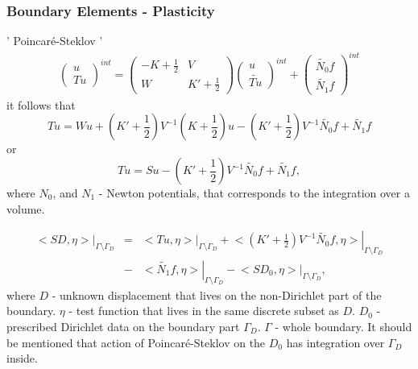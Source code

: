 \subsubsection{Boundary Elements - Plasticity}\label{sec:BEMPLAST}
' Poincar\'e-Steklov '
\begin{equation}
\begin{array}{c}
\left( \begin{array}{l}
 u \\
 Tu
 \end{array}
 \right)^{int}=\left( \begin{array}{cc}
 -K+\frac{1}{2} & V \\
 W & K'+\frac{1}{2}
 \end{array}
 \right)
 \left( \begin{array}{l}
  u \\
  \tilde{Tu}
 \end{array}
 \right)^{int}
 +\left( \begin{array}{l}
  \widetilde{N_0}f \\
  \widetilde{N_1}f
 \end{array}
 \right)^{int}
\end{array} \nonumber
\end{equation}
it follows that 
\begin{equation}\nonumber
Tu=Wu+\left(K'+\frac{1}{2}\right)V^{-1}\left(K+\frac{1}{2}\right)u-\left(K'+\frac{1}{2}\right)V^{-1}\tilde{N_0}f+\tilde{N_1}f
\end{equation}
or 
\begin{equation}\nonumber
Tu=Su-\left(K'+\frac{1}{2}\right)V^{-1}\tilde{N_0}f+\tilde{N_1}f,
\end{equation}
where $N_0$, and $N_1$ - Newton potentials, that corresponds to the integration over a volume.

\begin{eqnarray} \nonumber
\left.<SD,\eta>\right|_{\Gamma\setminus\Gamma_D}&=&\left.<Tu,\eta>\right|_{\Gamma\setminus\Gamma_D}
+\left.<\left(K'+\frac{1}{2}\right)V^{-1}\tilde{N_0}f,\eta>\right|_{\Gamma\setminus\Gamma_D}\nonumber \\[2ex]
&-&\left.<\tilde{N_1}f,\eta>\right|_{\Gamma\setminus\Gamma_D}-\left.<SD_0,\eta>\right|_{\Gamma\setminus\Gamma_D},
\end{eqnarray}
where $D$ - unknown displacement that lives on the non-Dirichlet part of the boundary. $\eta$ - test function that lives in the same discrete subset as $D$. $D_0$ - prescribed Dirichlet data on the boundary part $\Gamma_D$. $\Gamma$ - whole boundary. It should be mentioned that action of Poincar\'e-Steklov on the $D_0$ has integration over $\Gamma_D$ inside.

